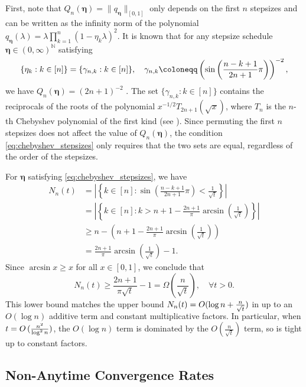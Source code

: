 \documentclass[11pt]{article}
\newcommand{\N}{\mathbb{N}}
\newcommand{\norm}[1]{\lVert#1\rVert}
\newcommand{\schedule}{\bm{\eta}}
\begin{document}
First, note that $Q_n(\schedule) = \norm{ q_{\schedule} }_{[0,1]}$ only depends on the first $n$ stepsizes and can be written as the infinity norm of the polynomial $q_{\schedule}(\lambda) = \lambda\prod_{k=1}^n(1-\eta_k\lambda)^2$.
It is known that for any stepsize schedule $\schedule\in(0,\infty)^{\N}$ satisfying
\begin{equation}\label{eq:chebyshev_stepsizes}
    \{ \eta_k: k\in[n] \} = \{ \gamma_{n,k}: k\in[n] \},
    \quad
    \gamma_{n,k} \coloneqq \left(\sin\left(\frac{n-k+1}{2n+1}\pi\right) \right)^{\smash{-2}},
\end{equation}
we have $Q_n(\schedule) = (2n+1)^{-2}$ \cite{nemirovsky:1992}.
The set $\{ \gamma_{n,k}: k\in[n] \}$ contains the reciprocals of the roots of the polynomial $x^{-1/2}T_{2n+1}(\sqrt{x})$, where $T_n$ is the $n$-th Chebyshev polynomial of the first kind (see ).
Since permuting the first $n$ stepsizes does not affect the value of $Q_n(\schedule)$, the condition \eqref{eq:chebyshev_stepsizes} only requires that the two sets are equal, regardless of the order of the stepsizes.

For $\schedule$ satisfying \eqref{eq:chebyshev_stepsizes}, we have
\begin{align*}
    N_n(t)
    &= \left\lvert \left\{ k\in[n]:  \sin\left(\frac{n-k+1}{2n+1}\pi\right) < \frac{1}{\sqrt{t}} \right\} \right\rvert \\
    &= \left\lvert \left\{ k\in[n]: k > n + 1 - \frac{2n+1}{\pi}\arcsin\left( \frac{1}{\sqrt{t}} \right) \right\} \right\rvert \\
    &\geq n - \left( n + 1 - \frac{2n+1}{\pi}\arcsin\left( \frac{1}{\sqrt{t}} \right) \right)\\
    &= \frac{2n+1}{\pi}\arcsin\left( \frac{1}{\sqrt{t}} \right) - 1.
\end{align*}
Since $\arcsin x \geq x$ for all $x\in[0,1]$, we conclude that
\[
    N_n(t) \geq \frac{2n+1}{\pi\sqrt{t}} - 1 = \Omega\left( \frac{n}{\sqrt{t}} \right), \quad\forall t> 0.
\]
This lower bound matches the upper bound $N_n(t)=O(\log n + \smash{\frac{n}{\sqrt{t}}})$ in  up to an $O(\log n)$ additive term and constant multiplicative factors.
In particular, when $t=O\left(\smash{\frac{n^2}{\log^2 n}}\right)$, the $O(\log n)$ term is dominated by the $O(\frac{n}{\sqrt{t}})$ term, so  is tight up to constant factors.




\subsection{Non-Anytime Convergence Rates}\label{sec:non_anytime_rate}
\end{document}
